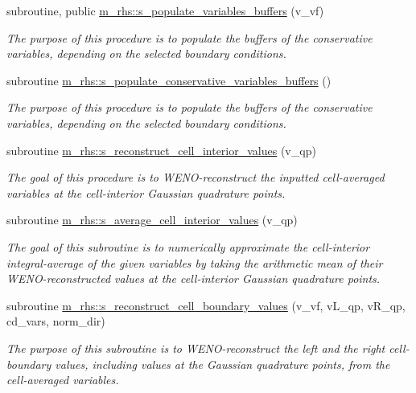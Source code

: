 \begin{DoxyCompactItemize}
subroutine, public \hyperlink{namespacem__rhs_a5735aa0dc9d5759c2056a79d4a8c484b}{m\+\_\+rhs\+::s\+\_\+populate\+\_\+variables\+\_\+buffers} (v\+\_\+vf)
\begin{DoxyCompactList}\small\item\em The purpose of this procedure is to populate the buffers of the conservative variables, depending on the selected boundary conditions. \end{DoxyCompactList}\item 
subroutine \hyperlink{namespacem__rhs_a2647dbdf6b09315564ef060e1f49df0d}{m\+\_\+rhs\+::s\+\_\+populate\+\_\+conservative\+\_\+variables\+\_\+buffers} ()
\begin{DoxyCompactList}\small\item\em The purpose of this procedure is to populate the buffers of the conservative variables, depending on the selected boundary conditions. \end{DoxyCompactList}\item 
subroutine \hyperlink{namespacem__rhs_a379b85ad4f20d9a3108b3a9df2ef9ff1}{m\+\_\+rhs\+::s\+\_\+reconstruct\+\_\+cell\+\_\+interior\+\_\+values} (v\+\_\+qp)
\begin{DoxyCompactList}\small\item\em The goal of this procedure is to W\+E\+N\+O-\/reconstruct the inputted cell-\/averaged variables at the cell-\/interior Gaussian quadrature points. \end{DoxyCompactList}\item 
subroutine \hyperlink{namespacem__rhs_ab3b720ac99f76621fd7086da9405490f}{m\+\_\+rhs\+::s\+\_\+average\+\_\+cell\+\_\+interior\+\_\+values} (v\+\_\+qp)
\begin{DoxyCompactList}\small\item\em The goal of this subroutine is to numerically approximate the cell-\/interior integral-\/average of the given variables by taking the arithmetic mean of their W\+E\+N\+O-\/reconstructed values at the cell-\/interior Gaussian quadrature points. \end{DoxyCompactList}\item 
subroutine \hyperlink{namespacem__rhs_ac5aa3e8228234f05fd5b899a6d309260}{m\+\_\+rhs\+::s\+\_\+reconstruct\+\_\+cell\+\_\+boundary\+\_\+values} (v\+\_\+vf, v\+L\+\_\+qp, v\+R\+\_\+qp, cd\+\_\+vars, norm\+\_\+dir)
\begin{DoxyCompactList}\small\item\em The purpose of this subroutine is to W\+E\+N\+O-\/reconstruct the left and the right cell-\/boundary values, including values at the Gaussian quadrature points, from the cell-\/averaged variables. \end{DoxyCompactList}\item 

\end{DoxyCompactItemize}
